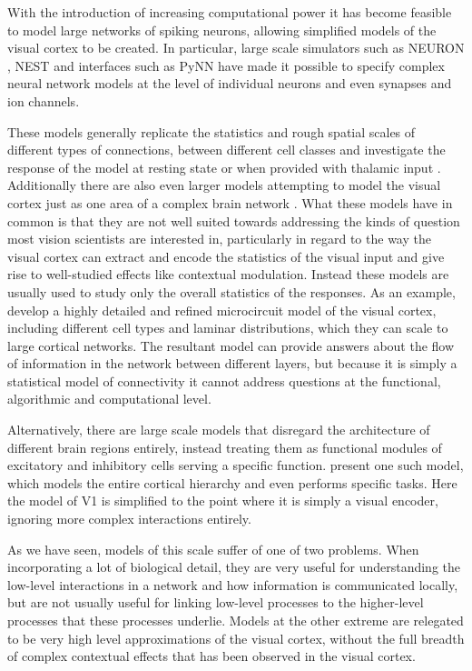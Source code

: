With the introduction of increasing computational power it has become
feasible to model large networks of spiking neurons, allowing
simplified models of the visual cortex to be created. In particular,
large scale simulators such as NEURON \citep{Hines1994}, NEST
\citep{Gewaltig2007} and interfaces such as PyNN \citep{Davison2009}
have made it possible to specify complex neural network models at the
level of individual neurons and even synapses and ion channels.

These models generally replicate the statistics and rough spatial
scales of different types of connections, between different cell
classes and investigate the response of the model at resting state or
when provided with thalamic input \citep{Shelley2002,
  Potjans2014}. Additionally there are also even larger models
attempting to model the visual cortex just as one area of a complex
brain network \citep{Eliasmith2012}. What these models have in common
is that they are not well suited towards addressing the kinds of
question most vision scientists are interested in, particularly in
regard to the way the visual cortex can extract and encode the
statistics of the visual input and give rise to well-studied effects
like contextual modulation. Instead these models are usually used to
study only the overall statistics of the responses. As an example,
\cite{Potjans2014} develop a highly detailed and refined microcircuit
model of the visual cortex, including different cell types and laminar
distributions, which they can scale to large cortical networks. The
resultant model can provide answers about the flow of information in
the network between different layers, but because it is simply a
statistical model of connectivity it cannot address questions at the
functional, algorithmic and computational level.

Alternatively, there are large scale models that disregard the
architecture of different brain regions entirely, instead treating
them as functional modules of excitatory and inhibitory cells serving
a specific function. \cite{Eliasmith2012} present one such model,
which models the entire cortical hierarchy and even performs specific
tasks. Here the model of V1 is simplified to the point where it is
simply a visual encoder, ignoring more complex interactions entirely.

As we have seen, models of this scale suffer of one of two
problems. When incorporating a lot of biological detail, they are very
useful for understanding the low-level interactions in a network and
how information is communicated locally, but are not usually useful
for linking low-level processes to the higher-level processes that
these processes underlie. Models at the other extreme are relegated to
be very high level approximations of the visual cortex, without the
full breadth of complex contextual effects that has been observed in
the visual cortex.

